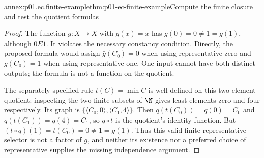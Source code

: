 \begin{annexitem}{annex:p01.ec.finite-example}{thm:p01-ec-finite-example}{Compute the finite closure and test the quotient formulas}
\begin{proof}
The function \(g:X\to X\) with \(g(x)=x\) has
\(g(0)=0\ne1=g(1)\), although \(0E1\). It violates
the necessary constancy condition. Directly, the proposed
formula would assign \(\bar g(C_0)=0\) when using representative
zero and \(\bar g(C_0)=1\) when using representative one.
One input cannot have both distinct outputs; the formula is not a
function on the quotient.

The separately specified rule \(t(C)=\min C\) is well-defined
on this two-element quotient: inspecting the two finite subsets
of \(\N\) gives least elements zero and four respectively.
Its graph is \(\{\langle C_0,0\rangle,\langle C_1,4\rangle\}\).
Then \(q(t(C_0))=q(0)=C_0\) and
\(q(t(C_1))=q(4)=C_1\), so \(q\circ t\) is the quotient's
identity function. But \((t\circ q)(1)=t(C_0)=0\ne1=g(1)\).
Thus this valid finite representative selector is not a factor
of \(g\), and neither its existence nor a preferred choice of
representative supplies the missing independence argument.
\end{proof}
\end{annexitem}
